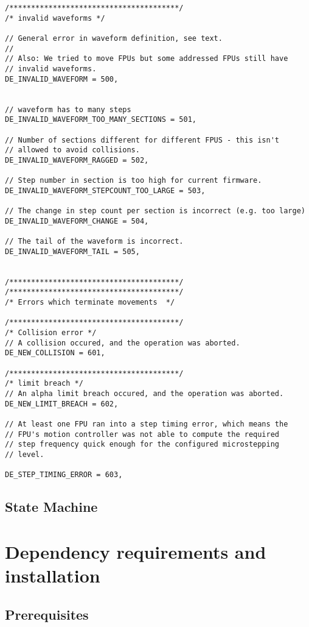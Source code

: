 \documentclass{scrartcl}[12pt,a4paper]
\begin{document}
\begin{verbatim}
/***************************************/
/* invalid waveforms */

// General error in waveform definition, see text.
//
// Also: We tried to move FPUs but some addressed FPUs still have
// invalid waveforms.
DE_INVALID_WAVEFORM = 500,


// waveform has to many steps
DE_INVALID_WAVEFORM_TOO_MANY_SECTIONS = 501,

// Number of sections different for different FPUS - this isn't
// allowed to avoid collisions.
DE_INVALID_WAVEFORM_RAGGED = 502,

// Step number in section is too high for current firmware.
DE_INVALID_WAVEFORM_STEPCOUNT_TOO_LARGE = 503,

// The change in step count per section is incorrect (e.g. too large)
DE_INVALID_WAVEFORM_CHANGE = 504,

// The tail of the waveform is incorrect.
DE_INVALID_WAVEFORM_TAIL = 505,


/***************************************/
/***************************************/
/* Errors which terminate movements  */

/***************************************/
/* Collision error */
// A collision occured, and the operation was aborted.
DE_NEW_COLLISION = 601,

/***************************************/
/* limit breach */
// An alpha limit breach occured, and the operation was aborted.
DE_NEW_LIMIT_BREACH = 602,

// At least one FPU ran into a step timing error, which means the
// FPU's motion controller was not able to compute the required
// step frequency quick enough for the configured microstepping
// level.

DE_STEP_TIMING_ERROR = 603,
\end{verbatim}


\subsection{State Machine}

\appendix

\section{Dependency requirements and installation}
\label{sec:installationfromscratch}


\subsection{Prerequisites}
\end{document}
